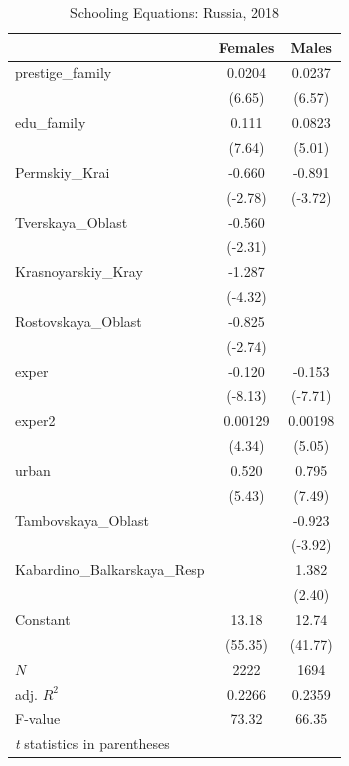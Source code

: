 \documentclass[a4paper,12pt,twoside]{book}
\begin{document}
\begin{table}[htbp]\centering
	\caption{Schooling Equations: Russia, 2018}
	\begin{tabular}{l*{2}{c}}
		\hline\hline
		&\multicolumn{1}{c}{Females}&\multicolumn{1}{c}{Males}\\
		\hline
		prestige\_family&   0.0204&   0.0237\\
		&   (6.65)&   (6.57)\\
		edu\_family&    0.111&   0.0823\\
		&   (7.64)&   (5.01)\\
		Permskiy\_Krai&   -0.660&   -0.891\\
		&  (-2.78)&  (-3.72)\\
		Tverskaya\_Oblast&   -0.560&         \\
		&  (-2.31)&         \\
		Krasnoyarskiy\_Kray&   -1.287&         \\
		&  (-4.32)&         \\
		Rostovskaya\_Oblast&   -0.825&         \\
		&  (-2.74)&         \\
		exper     &   -0.120&   -0.153\\
		&  (-8.13)&  (-7.71)\\
		exper2    &  0.00129&  0.00198\\
		&   (4.34)&   (5.05)\\
		urban     &    0.520&    0.795\\
		&   (5.43)&   (7.49)\\
		Tambovskaya\_Oblast&         &   -0.923\\
		&         &  (-3.92)\\
		Kabardino\_Balkarskaya\_Resp&         &    1.382\\
		&         &   (2.40)\\
		Constant    &    13.18&    12.74\\
		&  (55.35)&  (41.77)\\
		\hline
		\(N\)     &     2222&     1694\\
		adj. \(R^{2}\)&   0.2266      &   0.2359      \\
		F-value &    73.32     &   66.35      \\
		\hline\hline
		\multicolumn{3}{l}{\footnotesize \textit{t} statistics in parentheses}\\
	\end{tabular}
\end{table}
\end{document}
